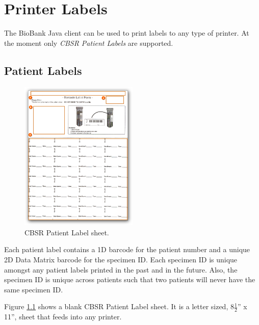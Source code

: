 \chapter{Printer Labels}
\label{chap:printer_labels}

The BioBank Java client can be used to print labels to any type of printer. At
the moment only \emph{CBSR Patient Labels} are supported.

\section{Patient Labels}
\label{sec:printer_labels}

\begin{figure}
  \vspace{-20pt}
  \begin{center}
    \includegraphics[width=0.5\textwidth]{screenshots/printer_labels/01_cbsr_patient_label_sheet}
  \end{center}
  \caption{CBSR Patient Label sheet.}
  \label{fig:cbsr_patient_label_sheet}
  \vspace{-15pt}
\end{figure}

Each patient label contains a 1D barcode for the patient number and a unique 2D
Data Matrix barcode for the specimen ID. Each specimen ID is unique amongst any
patient labels printed in the past and in the future. Also, the specimen ID is
unique across patients such that two patients will never have the same specimen
ID.

Figure \ref{fig:cbsr_patient_label_sheet} shows a blank CBSR Patient Label
sheet. It is a letter sized, 8$\frac{1}{2}$'' x 11'', sheet that
feeds into any printer.

